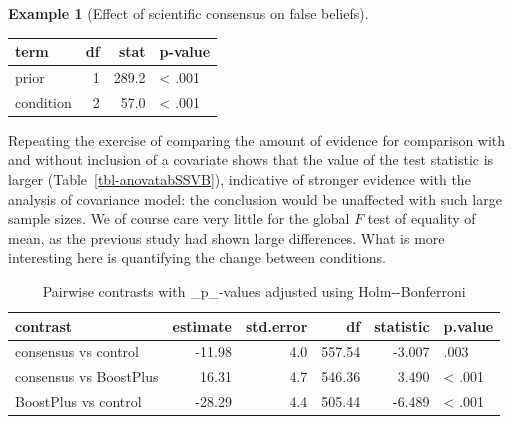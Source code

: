 \documentclass[
  11pt,
  letterpaper,
]{scrbook}
\theoremstyle{definition}
\newtheorem{example}{Example}[chapter]
\theoremstyle{remark}
\begin{document}
\begin{example}[Effect of scientific consensus on false
beliefs]
\begin{table}
\begin{minipage}[t]{\linewidth}
{}

\end{minipage}%
\newline
\begin{minipage}[t]{\linewidth}

{\centering 

\centering
\begin{tabular}[t]{lrrl}
\toprule
term & df & stat & p-value\\
\midrule
prior & 1 & 289.2 & < .001\\
condition & 2 & 57.0 & < .001\\
\bottomrule
\end{tabular}

}

\end{minipage}%

\end{table}

Repeating the exercise of comparing the amount of evidence for
comparison with and without inclusion of a covariate shows that the
value of the test statistic is larger (Table~\ref{tbl-anovatabSSVB}),
indicative of stronger evidence with the analysis of covariance model:
the conclusion would be unaffected with such large sample sizes. We of
course care very little for the global \(F\) test of equality of mean,
as the previous study had shown large differences. What is more
interesting here is quantifying the change between conditions.

\begin{table}

\caption{\label{tbl-contraststabSSVB}Pairwise contrasts with
\_p\_-values adjusted using
Holm-\/-Bonferroni}\begin{minipage}[t]{\linewidth}

{\centering 

\centering
\begin{tabular}[t]{lrrrrl}
\toprule
contrast & estimate & std.error & df & statistic & p.value\\
\midrule
consensus vs control & -11.98 & 4.0 & 557.54 & -3.007 & .003\\
consensus vs BoostPlus & 16.31 & 4.7 & 546.36 & 3.490 & < .001\\
BoostPlus vs control & -28.29 & 4.4 & 505.44 & -6.489 & < .001\\
\bottomrule
\end{tabular}

}
\end{minipage}
\end{table}
\end{example}
\end{document}
